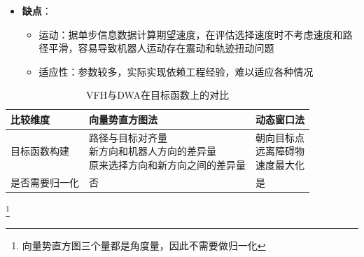 \documentclass[../main.tex]{subfiles}
\begin{document}
\begin{enumerate}
\begin{itemize}
            \item \textbf{缺点}：
                \begin{itemize}
                    \item 运动：据单步信息数据计算期望速度，在评估选择速度时不考虑速度和路径平滑，容易导致机器人运动存在震动和轨迹扭动问题
                    \item 适应性：参数较多，实际实现依赖工程经验，难以适应各种情况
                \end{itemize}
        \end{itemize}


\begin{table}[H]
    \centering
    \small
    \begin{tabular}{
        >{\centering\arraybackslash}m{4cm}
        >{\centering\arraybackslash}m{5.5cm}
        >{\centering\arraybackslash}m{5.5cm}
    }
        \toprule
        \textbf{比较维度} & \textbf{向量势直方图法} & \textbf{动态窗口法} \\
        \midrule
        目标函数构建 & 
        \makecell[{{p{5.5cm}}}]{路径与目标对齐量 \\ 新方向和机器人方向的差异量 \\ 原来选择方向和新方向之间的差异量} &
        \makecell[{{p{5.5cm}}}]{朝向目标点 \\ 远离障碍物 \\ 速度最大化} \\
        \midrule
        是否需要归一化 & 否 & 是 \\
        \bottomrule
    \end{tabular}
    \caption{VFH与DWA在目标函数上的对比}
\end{table}\footnote{向量势直方图三个量都是角度量，因此不需要做归一化}


    \end{enumerate}
\end{document}
